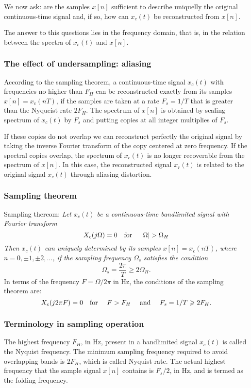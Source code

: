 \documentclass[oneside, final, 14pt]{extarticle}
\begin{document}
We now ask: are the samples $x[n]$ sufficient to describe uniquelly
the original continuous-time signal and, if so, how can $x_c(t)$
be reconstructed from $x[n]$.

Tne answer to this questions lies in the frequency domain, that is,
in the relation between the spectra of $x_c(t)$ and $x[n]$.

\subsubsection{The effect of undersampling: aliasing}

According to the sampling theorem, a continuous-time signal
$x_c(t)$ with frequencies no higher than $F_H$ can be reconstructed
exactly from its samples $x[n]=x_c(nT)$, if the samples are taken
at a rate $F_s = 1/T$ that is greater than the Nyqueist rate $2F_H$.
The spectrum of $x[n]$ is obtained by scaling spectrum of $x_c(t)$
by $F_s$ and putting copies at all integer multiplies of $F_s$.

If these copies do not overlap we can reconstruct perfectly the original
signal by taking the inverse Fourier transform of the copy
centered at zero frequency. If the spectral copies overlap, the spectrum
of $x_c(t)$ is no longer recoverable from the spectrum of $x[n]$.
In this case, the reconstructed signal $x_r(t)$ is related
to the original signal $x_c(t)$ through aliasing distortion.

\subsubsection{Sampling theorem}

Sampling thereom: \textit{Let $x_c(t)$ be a continuous-time bandlimited
signal with Fourier transform}
\[
	X_c(j\Omega) = 0 \text{\quad for \quad} |\Omega| > \Omega_H
\]
\textit{Then $x_c(t)$ can uniquely determined by its samples
$x[n]=x_c(nT)$, where $n = 0,\pm1,\pm2, \dots$, if the sampling
frequency $\Omega_s$ satisfies the condition}
\[
  \Omega_s = \frac{2\pi}{T} \geqslant 2 \Omega_H.
\]
In terms of the frequency $F = \Omega / 2\pi$ in Hz, the
conditions of the sampling theorem are:
\[
  X_c(j2\pi F) = 0 \text{\quad for \quad} F > F_H \text{ \quad and \quad}
  F_s = 1 / T \geqslant 2 F_H.
\]

\subsubsection{Terminology in sampling operation}
The highest frequency $F_H$, in Hz, present in a bandlimited signal
$x_c(t)$ is called the Nyquist frequency. The minimum sampling frequency
required to avoid overlapping bands is $2F_H$, which is called Nyquist rate.
The actual highest frequency that the sample signal $x[n]$ contains
is $F_s/2$, in Hz, and is termed as the folding frequency.
\end{document}

